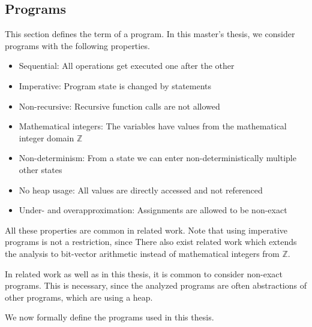 \subsection{Programs}

This section defines the term of a program.
In this master's thesis, we consider programs with the following properties.

\begin{itemize}
\item Sequential: All operations get executed one after the other
\item Imperative: Program state is changed by statements
\item Non-recursive: Recursive function calls are not allowed
\item Mathematical integers: The variables have values from the mathematical integer domain $\mathbb{Z}$
\item Non-determinism: From a state we can enter non-deterministically multiple other states
\item No heap usage: All values are directly accessed and not referenced
\item Under- and overapproximation: Assignments are allowed to be non-exact
\end{itemize}

All these properties are common in related work.
Note that using imperative programs is not a restriction, since 
There also exist related work which extends the analysis to bit-vector arithmetic instead of mathematical integers from $\mathbb{Z}$. \cite{bitvectorarithmetic}

In related work as well as in this thesis, it is common to consider non-exact programs.
This is necessary, since the analyzed programs are often abstractions of other programs, which are using a heap.


We now formally define the programs used in this thesis.

